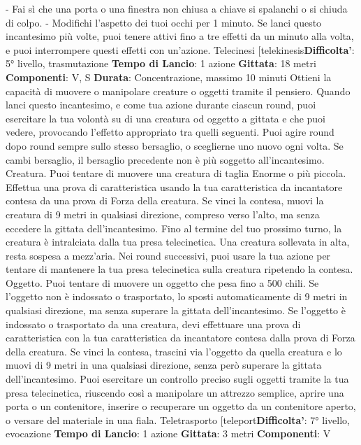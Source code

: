 \begin{multicols}{2}
- Fai sì che una porta o una finestra non chiusa a
chiave si spalanchi o si chiuda di colpo.
- Modifichi l’aspetto dei tuoi occhi per 1 minuto.
Se lanci questo incantesimo più volte, puoi tenere attivi
fino a tre effetti da un minuto alla volta, e puoi
interrompere questi effetti con un’azione.
Telecinesi
[telekinesis\textbf{Difficolta'}:
5° livello, trasmutazione
\textbf{Tempo di Lancio}: 1 azione
\textbf{Gittata}: 18 metri
\textbf{Componenti}: V, S
\textbf{Durata}: Concentrazione, massimo 10 minuti
Ottieni la capacità di muovere o manipolare creature o
oggetti tramite il pensiero. Quando lanci questo
incantesimo, e come tua azione durante ciascun round,
puoi esercitare la tua volontà su di una creatura od
oggetto a gittata e che puoi vedere, provocando l’effetto
appropriato tra quelli seguenti. Puoi agire round dopo
round sempre sullo stesso bersaglio, o sceglierne uno
nuovo ogni volta. Se cambi bersaglio, il bersaglio
precedente non è più soggetto all’incantesimo.
Creatura. Puoi tentare di muovere una creatura di
taglia Enorme o più piccola. Effettua una prova di
caratteristica usando la tua caratteristica da incantatore
contesa da una prova di Forza della creatura. Se vinci
la contesa, muovi la creatura di 9 metri in qualsiasi
direzione, compreso verso l’alto, ma senza eccedere la
gittata dell’incantesimo. Fino al termine del tuo
prossimo turno, la creatura è intralciata dalla tua presa
telecinetica. Una creatura sollevata in alta, resta
sospesa a mezz’aria.
Nei round successivi, puoi usare la tua azione per
tentare di mantenere la tua presa telecinetica sulla
creatura ripetendo la contesa.
Oggetto. Puoi tentare di muovere un oggetto che pesa
fino a 500 chili. Se l’oggetto non è indossato o
trasportato, lo sposti automaticamente di 9 metri in
qualsiasi direzione, ma senza superare la gittata
dell’incantesimo.
Se l’oggetto è indossato o trasportato da una creatura,
devi effettuare una prova di caratteristica con la tua
caratteristica da incantatore contesa dalla prova di
Forza della creatura. Se vinci la contesa, trascini via
l’oggetto da quella creatura e lo muovi di 9 metri in una
qualsiasi direzione, senza però superare la gittata
dell’incantesimo.
Puoi esercitare un controllo preciso sugli oggetti tramite
la tua presa telecinetica, riuscendo così a manipolare
un attrezzo semplice, aprire una porta o un contenitore,
inserire o recuperare un oggetto da un contenitore
aperto, o versare del materiale in una fiala.
Teletrasporto
[teleport\textbf{Difficolta'}:
7° livello, evocazione
\textbf{Tempo di Lancio}: 1 azione
\textbf{Gittata}: 3 metri
\textbf{Componenti}: V

\end{multicols}
